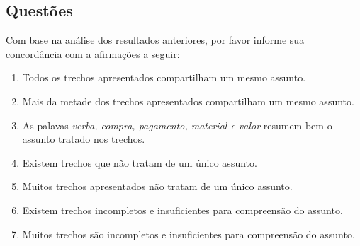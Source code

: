 \newpage

\subsection*{Questões}


Com base na análise dos resultados anteriores, por favor informe sua concordância com a afirmações a seguir:





\begin{enumerate}

\item Todos os trechos apresentados compartilham um mesmo assunto.
\likert

\item Mais da metade dos trechos apresentados compartilham um mesmo assunto.
\likert

\item As palavas \textit{verba, compra, pagamento, material e valor} resumem bem o assunto tratado nos trechos.
\likert

\item Existem trechos que não tratam de um único assunto.
\likert

\item Muitos trechos apresentados não tratam de um único assunto. 
\likert

\item Existem trechos incompletos e insuficientes para compreensão do assunto.
\likert

\item Muitos trechos são incompletos e insuficientes para compreensão do assunto.
\likert



\end{enumerate}







